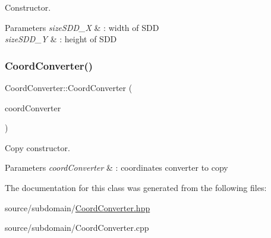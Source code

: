 Constructor. 


\begin{DoxyParams}{Parameters}
{\em size\+S\+D\+D\+\_\+X} & \+: width of S\+DD \\
\hline
{\em size\+S\+D\+D\+\_\+Y} & \+: height of S\+DD \\
\hline
\end{DoxyParams}
\mbox{\label{classCoordConverter_af11209a489a46dd335db0635d811999d}} 
\subsubsection{\texorpdfstring{Coord\+Converter()}{CoordConverter()}\hspace{0.1cm}{\footnotesize\ttfamily [4/4]}}
{\footnotesize\ttfamily Coord\+Converter\+::\+Coord\+Converter (\begin{DoxyParamCaption}\item[{const \hyperlink{classCoordConverter}{Coord\+Converter} \&}]{coord\+Converter }\end{DoxyParamCaption})}



Copy constructor. 


\begin{DoxyParams}{Parameters}
{\em coord\+Converter} & \+: coordinates converter to copy \\
\hline
\end{DoxyParams}


The documentation for this class was generated from the following files\+:\begin{DoxyCompactItemize}
\item 
source/subdomain/\hyperlink{source_2subdomain_2CoordConverter_8hpp}{Coord\+Converter.\+hpp}\item 
source/subdomain/Coord\+Converter.\+cpp\end{DoxyCompactItemize}
